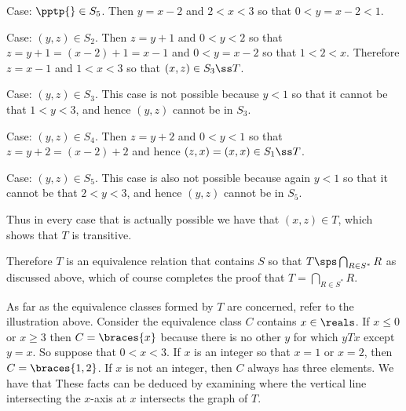 {{    Case: $\pptp{} \in S_5$.
    Then $y=x-2$ and $2 < x < 3$ so that $0 < y=x-2 < 1$.
    \begin{indpar}
      Case: $(y,z) \in S_2$.
      Then $z = y+1$ and $0 < y < 2$ so that $z = y+1 = (x-2) + 1 = x-1$ and $0 < y = x-2$ so that $1 < 2 < x$.
      Therefore $z=x-1$ and $1 < x < 3$ so that $(x,z) \in S_3 \ss T$.

      Case: $(y,z) \in S_3$.
      This case is not possible because $y < 1$ so that it cannot be that $1 < y < 3$, and hence $(y,z)$ cannot be in $S_3$.

      Case: $(y,z) \in S_4$.
      Then $z = y+2$ and $0 < y < 1$ so that $z = y+2 = (x-2)+2$ and hence $(z,x) = (x,x) \in S_1 \ss T$.

      Case: $(y,z) \in S_5$.
      This case is also not possible because again $y < 1$ so that it cannot be that $2 < y < 3$, and hence $(y,z)$ cannot be in $S_5$.
    \end{indpar}

    Thus in every case that is actually possible we have that $(x,z) \in T$, which shows that $T$ is transitive.

    Therefore $T$ is an equivalence relation that contains $S$ so that $T \sps \bigcap_{R \in S^*} R$ as discussed above, which of course completes the proof that $T = \bigcap_{R \in S^*} R$.
  }

  As far as the equivalence classes formed by $T$ are concerned, refer to the illustration above.
  Consider the equivalence class $C$ contains $x \in \reals$.
  If $x \leq 0$ or $x \geq 3$ then $C = \braces{x}$ because there is no other $y$ for which $yTx$ except $y=x$.
  So suppose that $0 < x < 3$.
  If $x$ is an integer so that $x = 1$ or $x = 2$, then $C = \braces{1,2}$.
  If $x$ is not an integer, then $C$ always has three elements.
  We have that
  These facts can be deduced by examining where the vertical line intersecting the $x$-axis at $x$ intersects the graph of $T$.
}

